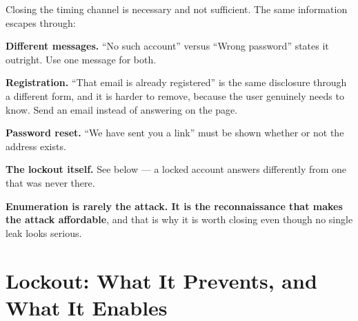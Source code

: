 \begin{conceptbox}
Closing the timing channel is necessary and not sufficient. The same
information escapes through:

\begin{tight}
  \item \textbf{Different messages.} ``No such account'' versus ``Wrong
        password'' states it outright. Use one message for both.
  \item \textbf{Registration.} ``That email is already registered'' is the same
        disclosure through a different form, and it is harder to remove,
        because the user genuinely needs to know. Send an email instead of
        answering on the page.
  \item \textbf{Password reset.} ``We have sent you a link'' must be shown
        whether or not the address exists.
  \item \textbf{The lockout itself.} See below --- a locked account answers
        differently from one that was never there.
\end{tight}

\smallskip
\textbf{Enumeration is rarely the attack. It is the reconnaissance that makes
the attack affordable}, and that is why it is worth closing even though no
single leak looks serious.
\end{conceptbox}

\section{Lockout: What It Prevents, and What It Enables}

